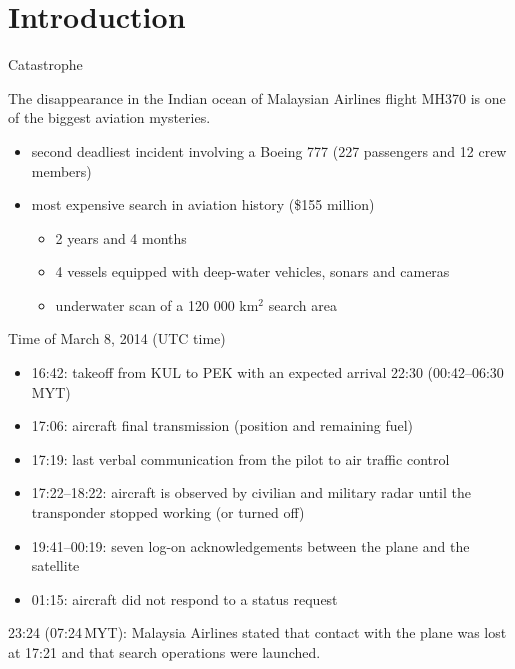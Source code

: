 \documentclass{beamer}
\begin{document}

\section{Introduction}

\begin{frame}{Catastrophe}

The disappearance in the Indian ocean of Malaysian Airlines flight MH370 is one of the biggest aviation mysteries.

\begin{itemize}
	\item second deadliest incident involving a Boeing 777 (227 passengers and 12 crew members) 
	\item most expensive search in aviation history (\$155 million)
	\begin{itemize}
		\item 2 years and 4 months
    	\item 4 vessels equipped with deep-water vehicles, sonars and cameras
  		\item underwater scan of a 120 000 km$^2$ search area
    \end{itemize}
 \end{itemize}
\end{frame}

\begin{frame}{Time of March 8, 2014  (UTC time)}
\begin{itemize}
	\item 16:42: takeoff from KUL to PEK with an expected arrival 22:30 (00:42--06:30\,MYT)
	\item 17:06: aircraft final transmission (position and remaining fuel)
	\item 17:19: last verbal communication from the pilot to air traffic control
	\item 17:22--18:22: aircraft is observed by civilian and military radar until the transponder stopped working (or turned off)
	\item 19:41--00:19: seven log-on acknowledgements between the plane and the satellite
	\item 01:15: aircraft did not respond to a status request
\end{itemize}

23:24 (07:24\,MYT): Malaysia Airlines stated that contact with the plane was lost at 17:21 and that search operations were launched.
\end{frame}
\end{document}
